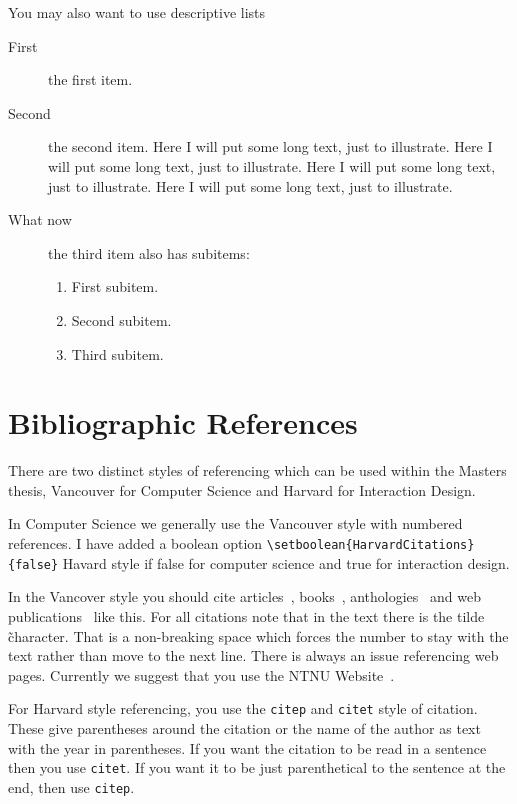 You may also want to use descriptive lists
\begin{description}
	\item[First] the first item.
	\item[Second] the second item. Here I will put some long text, just to illustrate.
	  Here I will put some long text, just to illustrate. Here I will put
	  some long text, just to illustrate. Here I will put some long text,
	  just to illustrate.
	\item [What now] the third item also has subitems:
	  \begin{enumerate}
		  \item First subitem.
		  \item Second subitem.
		  \item Third subitem.
	  \end{enumerate}
\end{description}


\section{Bibliographic References}

There are two distinct styles of referencing which can be used within the Masters thesis, Vancouver for Computer Science and Harvard for Interaction Design.

In Computer Science we generally use the Vancouver style with numbered references.  
I have added a boolean option \verb|\setboolean{HarvardCitations}{false}|  Havard style if false for computer science and true for interaction design.
 
In the Vancover style you should cite articles~\cite{Askvall1985}, books~\cite{Card1983},
anthologies~\cite{Lancaster1985} and web publications~\cite{Meldon1997}
like this. For all citations note that in the text there is the tilde \~ character.  
That is a non-breaking space which forces the number to stay with the text rather than move to the next line.
There is always an issue referencing web pages. Currently
we suggest that you use the NTNU Website~\cite{NTNU:Website}.


For Harvard style referencing, you use the \texttt{citep} and \texttt{citet} style of citation. 
These give parentheses around the citation or the name of the author as text with the year in parentheses.  
If you want the citation to be read in a sentence then you use  \texttt{citet}. 
If you want it to be just parenthetical to the sentence at the end, then use \texttt{citep}.

